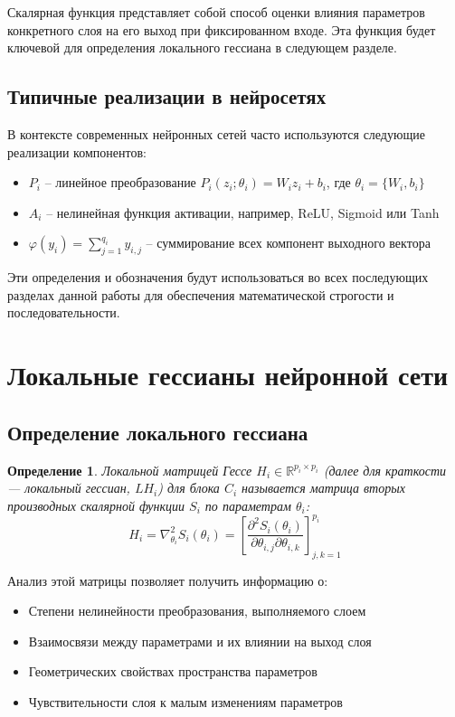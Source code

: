 \documentclass[a4paper,12pt]{article}
\newtheorem{definition}{Определение}
\begin{document}
Скалярная функция представляет собой способ оценки влияния параметров конкретного слоя на его выход
при фиксированном входе. Эта функция будет ключевой для определения локального гессиана в следующем разделе.

\subsection{Типичные реализации в нейросетях}

В контексте современных нейронных сетей часто используются следующие реализации компонентов:
\begin{itemize}
  \item $P_i$ -- линейное преобразование $P_i(z_i; \theta_i) = W_i z_i + b_i$, где $\theta_i = \{W_i, b_i\}$
  \item $A_i$ -- нелинейная функция активации, например, ReLU, Sigmoid или Tanh
  \item $\varphi(y_i) = \sum_{j=1}^{q_i} y_{i,j}$ -- суммирование всех компонент выходного вектора
\end{itemize}

Эти определения и обозначения будут использоваться во всех последующих разделах данной работы для обеспечения
математической строгости и последовательности.

\section{Локальные гессианы нейронной сети}

\subsection{Определение локального гессиана}

\begin{definition}
  Локальной матрицей Гессе $H_i \in \mathbb{R}^{p_i \times p_i}$ (далее для краткости — локальный гессиан,
  $LH_i$) для блока $C_i$ называется матрица вторых
  производных скалярной функции $S_i$ по параметрам $\theta_i$:
  \begin{equation}
    H_i = \nabla_{\theta_i}^2 S_i(\theta_i) = \left[ \frac{\partial^2 S_i(\theta_i)}{\partial \theta_{i,j}
    \partial \theta_{i,k}} \right]_{j,k=1}^{p_i}
  \end{equation}
\end{definition}

Анализ этой матрицы позволяет получить информацию о:

\begin{itemize}
  \item Степени нелинейности преобразования, выполняемого слоем
  \item Взаимосвязи между параметрами и их влиянии на выход слоя
  \item Геометрических свойствах пространства параметров
  \item Чувствительности слоя к малым изменениям параметров
\end{itemize}
\end{document}
